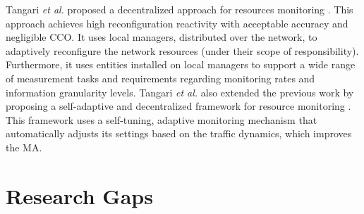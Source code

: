 Tangari \textit{et al.} proposed a decentralized approach for resources monitoring \cite{tangari_2017:decentralized_monitoring}. This approach achieves high reconfiguration reactivity with acceptable accuracy and negligible CCO. It uses local managers, distributed over the network, to adaptively reconfigure the network resources (under their scope of responsibility). Furthermore, it uses entities installed on local managers to support a wide range of measurement tasks and requirements regarding monitoring rates and information granularity levels. Tangari \textit{et al.} also extended the previous work by proposing a self-adaptive and decentralized framework for resource monitoring  \cite{Tangari_2018:adaptive_decentralized_monitoring}. This framework uses a self-tuning, adaptive monitoring mechanism that automatically adjusts its settings based on the traffic dynamics, which improves the MA.

\section{Research Gaps}


